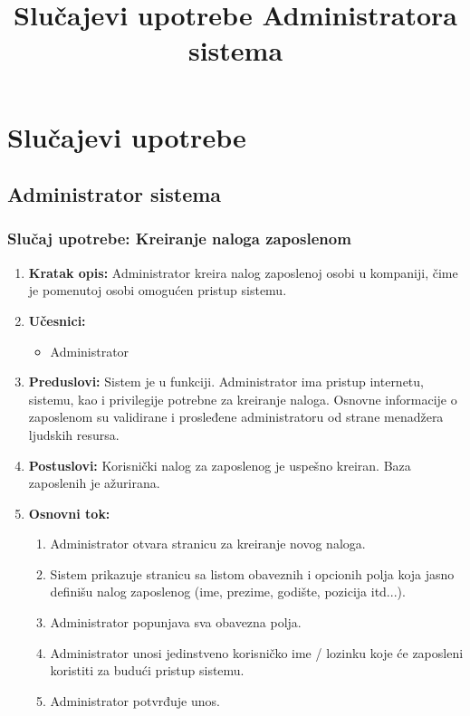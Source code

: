 \documentclass[a4paper]{article}
\title{Slučajevi upotrebe Administratora sistema}
\begin{document}
\maketitle

\section{Slučajevi upotrebe}

\subsection{Administrator sistema}
\subsubsection{Slučaj upotrebe: Kreiranje naloga zaposlenom}
\begin{enumerate}
    \item \textbf{Kratak opis:} Administrator kreira nalog zaposlenoj osobi u kompaniji, čime je pomenutoj osobi omogućen pristup sistemu.
    \item \textbf{Učesnici:}
        \begin{itemize}
            \item Administrator
        \end{itemize}
    \item \textbf{Preduslovi:} Sistem je u funkciji. Administrator ima pristup internetu, sistemu, kao i privilegije potrebne za kreiranje naloga. Osnovne informacije o zaposlenom su validirane i prosleđene administratoru od strane menadžera ljudskih resursa.
    \item \textbf{Postuslovi:} Korisnički nalog za zaposlenog je uspešno kreiran. Baza zaposlenih je ažurirana.
    \item \textbf{Osnovni tok:}
        \begin{enumerate}
            \item Administrator otvara stranicu za kreiranje novog naloga.
            \item Sistem prikazuje stranicu sa listom obaveznih i opcionih polja koja jasno definišu nalog zaposlenog (ime, prezime, godište, pozicija itd...).
            \item Administrator popunjava sva obavezna polja.
            \item Administrator unosi jedinstveno korisničko ime / lozinku koje će zaposleni koristiti za budući pristup sistemu.
            \item Administrator potvrđuje unos.

\end{enumerate}
\end{enumerate}
\end{document}

